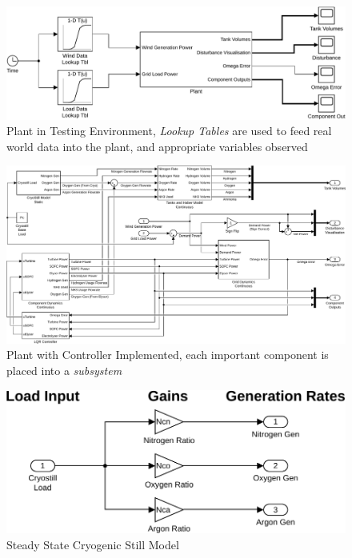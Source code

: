 \begin{figure}[p]
\centering
        \includegraphics[scale=0.7]{images/plant/global.pdf}
        \caption{Plant in Testing Environment, \emph{Lookup Tables} are used to feed real world data into the plant, and appropriate variables observed}
        \label{fig:global}
\end{figure}
\begin{figure}[p]
\centering
        \includegraphics[scale=0.6]{images/plant2/plant.pdf}
    \caption{Plant with Controller Implemented, each important component is placed into a \emph{subsystem}}
        \label{fig:plant}
\end{figure}
\begin{figure}[p]
\centering
        \includegraphics[scale=0.7]{images/plant2/cryo.pdf}
    \caption{Steady State Cryogenic Still Model}
        \label{fig:cryo}
\end{figure}
